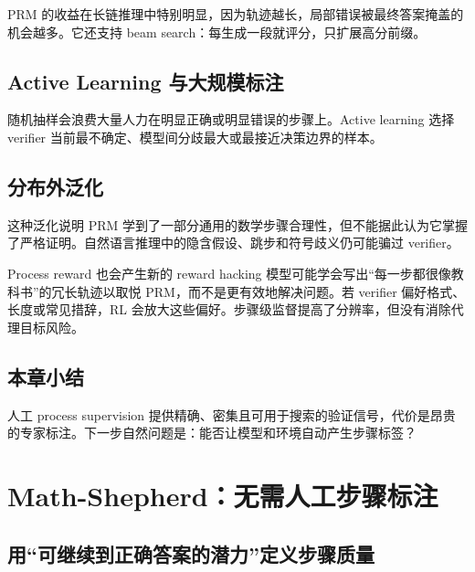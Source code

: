 \documentclass[a4paper]{article}
\begin{document}

PRM 的收益在长链推理中特别明显，因为轨迹越长，局部错误被最终答案掩盖的机会越多。它还支持 beam search：每生成一段就评分，只扩展高分前缀。

\subsection{Active Learning 与大规模标注}

随机抽样会浪费大量人力在明显正确或明显错误的步骤上。Active learning 选择 verifier 当前最不确定、模型间分歧最大或最接近决策边界的样本。


\subsection{分布外泛化}


这种泛化说明 PRM 学到了一部分通用的数学步骤合理性，但不能据此认为它掌握了严格证明。自然语言推理中的隐含假设、跳步和符号歧义仍可能骗过 verifier。

\begin{warningbox}{Process reward 也会产生新的 reward hacking}
模型可能学会写出“每一步都很像教科书”的冗长轨迹以取悦 PRM，而不是更有效地解决问题。若 verifier 偏好格式、长度或常见措辞，RL 会放大这些偏好。步骤级监督提高了分辨率，但没有消除代理目标风险。
\end{warningbox}

\subsection{本章小结}

人工 process supervision 提供精确、密集且可用于搜索的验证信号，代价是昂贵的专家标注。下一步自然问题是：能否让模型和环境自动产生步骤标签？

\section{Math-Shepherd：无需人工步骤标注}

\subsection{用“可继续到正确答案的潜力”定义步骤质量}
\end{document}
